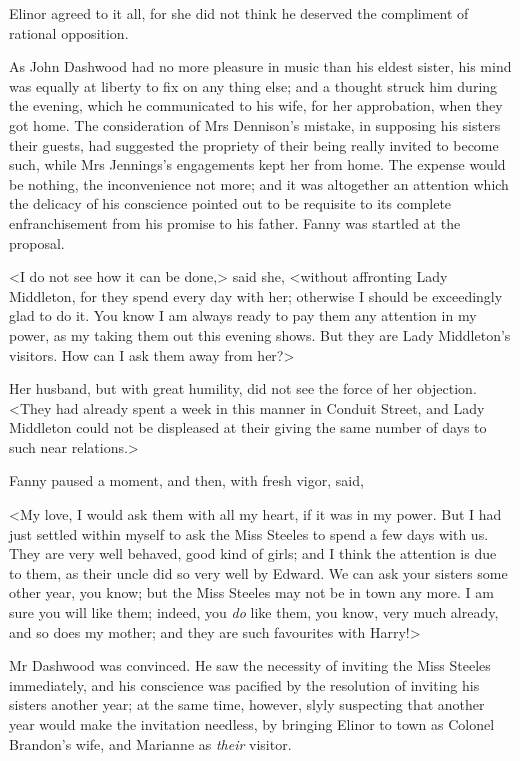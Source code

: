 Elinor agreed to it all, for she did not think he deserved the compliment of rational opposition.

As John Dashwood had no more pleasure in music than his eldest sister, his mind was equally at liberty to fix on any thing else; and a thought struck him during the evening, which he communicated to his wife, for her approbation, when they got home. The consideration of Mrs Dennison's mistake, in supposing his sisters their guests, had suggested the propriety of their being really invited to become such, while Mrs Jennings's engagements kept her from home. The expense would be nothing, the inconvenience not more; and it was altogether an attention which the delicacy of his conscience pointed out to be requisite to its complete enfranchisement from his promise to his father. Fanny was startled at the proposal.

<I do not see how it can be done,> said she, <without affronting Lady Middleton, for they spend every day with her; otherwise I should be exceedingly glad to do it. You know I am always ready to pay them any attention in my power, as my taking them out this evening shows. But they are Lady Middleton's visitors. How can I ask them away from her?>

Her husband, but with great humility, did not see the force of her objection. <They had already spent a week in this manner in Conduit Street, and Lady Middleton could not be displeased at their giving the same number of days to such near relations.>

Fanny paused a moment, and then, with fresh vigor, said,

<My love, I would ask them with all my heart, if it was in my power. But I had just settled within myself to ask the Miss Steeles to spend a few days with us. They are very well behaved, good kind of girls; and I think the attention is due to them, as their uncle did so very well by Edward. We can ask your sisters some other year, you know; but the Miss Steeles may not be in town any more. I am sure you will like them; indeed, you \textit{do} like them, you know, very much already, and so does my mother; and they are such favourites with Harry!>

Mr Dashwood was convinced. He saw the necessity of inviting the Miss Steeles immediately, and his conscience was pacified by the resolution of inviting his sisters another year; at the same time, however, slyly suspecting that another year would make the invitation needless, by bringing Elinor to town as Colonel Brandon's wife, and Marianne as \textit{their} visitor.

